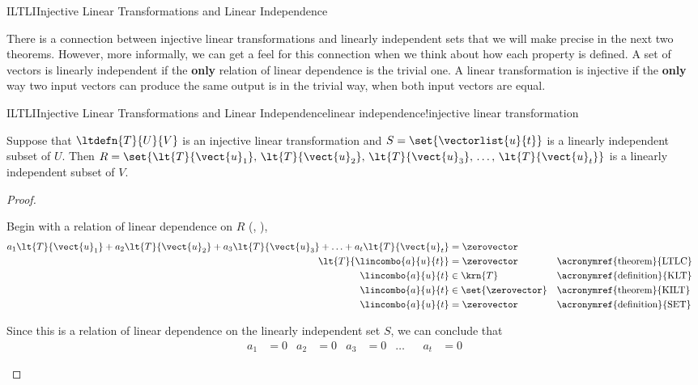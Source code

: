 \begin{subsect}{ILTLI}{Injective Linear Transformations and Linear Independence}
%
\begin{para}There is a connection between injective linear transformations and linearly independent sets that we will make precise in the next two theorems.  However, more informally, we can get a feel for this connection when we think about how each property is defined.  A set of vectors is linearly independent if the {\bf only} relation of linear dependence is the trivial one.  A linear transformation is injective if the {\bf only} way two input vectors can produce the same output is in the trivial way, when both input vectors are equal.\end{para}
%
\begin{theorem}{ILTLI}{Injective Linear Transformations and Linear Independence}{linear independence!injective linear transformation}
\begin{para}Suppose that $\ltdefn{T}{U}{V}$ is an injective linear transformation and $S=\set{\vectorlist{u}{t}}$ is a linearly independent subset of $U$.  Then $R=\set{\lt{T}{\vect{u}_1},\,\lt{T}{\vect{u}_2},\,\lt{T}{\vect{u}_3},\,\ldots,\,\lt{T}{\vect{u}_t}}$ is a linearly independent subset of $V$.\end{para}
\end{theorem}
%
\begin{proof}
%
\begin{para}Begin with a relation of linear dependence on $R$ (, ),
%
\begin{align*}
a_1\lt{T}{\vect{u}_1}+a_2\lt{T}{\vect{u}_2}+a_3\lt{T}{\vect{u}_3}+\ldots+a_t\lt{T}{\vect{u}_t}&=\zerovector\\
\lt{T}{\lincombo{a}{u}{t}}&=\zerovector&&\text{\acronymref{theorem}{LTLC}}\\
\lincombo{a}{u}{t}&\in\krn{T}&&\text{\acronymref{definition}{KLT}}\\
\lincombo{a}{u}{t}&\in\set{\zerovector}&&\text{\acronymref{theorem}{KILT}}\\
\lincombo{a}{u}{t}&=\zerovector&&\text{\acronymref{definition}{SET}}\\
\end{align*}
\end{para}
%
\begin{para}Since this is a relation of linear dependence on the linearly independent set $S$, we can conclude that
%
\begin{align*}
a_1&=0&a_2&=0&a_3&=0&\ldots&&a_t&=0

\end{align*}
\end{para}
\end{proof}
\end{subsect}

